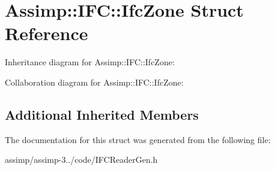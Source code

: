 \hypertarget{struct_assimp_1_1_i_f_c_1_1_ifc_zone}{\section{Assimp\+:\+:I\+F\+C\+:\+:Ifc\+Zone Struct Reference}
\label{struct_assimp_1_1_i_f_c_1_1_ifc_zone}
}


Inheritance diagram for Assimp\+:\+:I\+F\+C\+:\+:Ifc\+Zone\+:


Collaboration diagram for Assimp\+:\+:I\+F\+C\+:\+:Ifc\+Zone\+:
\subsection*{Additional Inherited Members}


The documentation for this struct was generated from the following file\+:\begin{DoxyCompactItemize}
\item 
assimp/assimp-\/3../code/I\+F\+C\+Reader\+Gen.\+h\end{DoxyCompactItemize}
